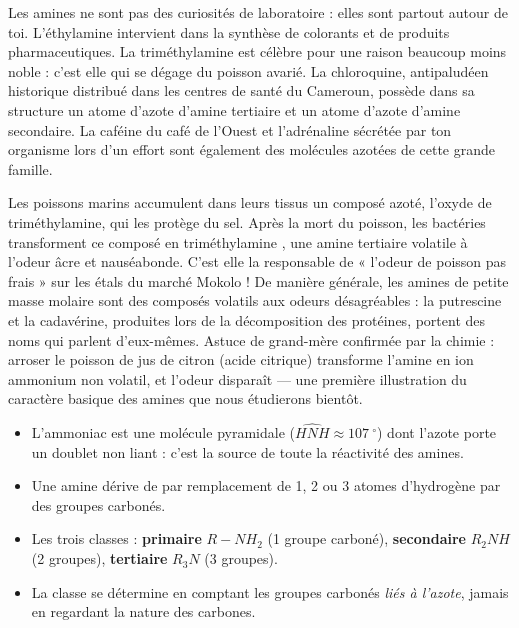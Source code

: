\documentclass[11pt]{article}
\providecommand{\degree}{^{\circ}}
\newcommand{\cle}[1]{{\popxbold\color{popdark}#1}}
\begin{document}
Les amines ne sont pas des curiosités de laboratoire : elles sont partout autour de toi. L'\cle{éthylamine}  intervient dans la synthèse de colorants et de produits pharmaceutiques. La \cle{triméthylamine}  est célèbre pour une raison beaucoup moins noble : c'est elle qui se dégage du poisson avarié. La \cle{chloroquine}, antipaludéen historique distribué dans les centres de santé du Cameroun, possède dans sa structure un atome d'azote d'amine tertiaire et un atome d'azote d'amine secondaire. La \cle{caféine} du café de l'Ouest et l'\cle{adrénaline} sécrétée par ton organisme lors d'un effort sont également des molécules azotées de cette grande famille.

\begin{savaistu}
Les poissons marins accumulent dans leurs tissus un composé azoté, l'oxyde de triméthylamine, qui les protège du sel. Après la mort du poisson, les bactéries transforment ce composé en \cle{triméthylamine} , une amine tertiaire volatile à l'odeur âcre et nauséabonde. C'est elle la responsable de « l'odeur de poisson pas frais » sur les étals du marché Mokolo ! De manière générale, les amines de petite masse molaire sont des composés volatils aux odeurs désagréables : la putrescine et la cadavérine, produites lors de la décomposition des protéines, portent des noms qui parlent d'eux-mêmes. Astuce de grand-mère confirmée par la chimie : arroser le poisson de jus de citron (acide citrique) transforme l'amine en ion ammonium non volatil, et l'odeur disparaît — une première illustration du caractère basique des amines que nous étudierons bientôt.
\end{savaistu}

\begin{aretenir}
\begin{itemize}
\item L'ammoniac  est une molécule \cle{pyramidale} ($\widehat{HNH} \approx \SI{107}{\degree}$) dont l'azote porte un \cle{doublet non liant} : c'est la source de toute la réactivité des amines.
\item Une \cle{amine} dérive de  par remplacement de 1, 2 ou 3 atomes d'hydrogène par des groupes carbonés.
\item Les trois classes : \textbf{primaire} $R-NH_2$ (1 groupe carboné), \textbf{secondaire} $R_2NH$ (2 groupes), \textbf{tertiaire} $R_3N$ (3 groupes).
\item La classe se détermine en comptant les groupes carbonés \emph{liés à l'azote}, jamais en regardant la nature des carbones.
\end{itemize}
\end{aretenir}
\end{document}
